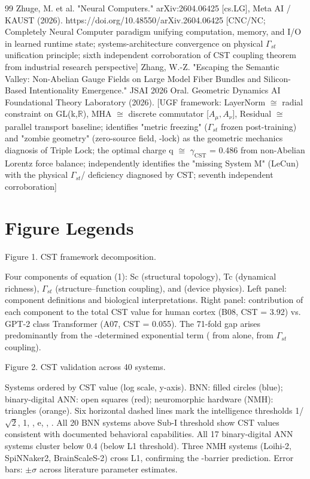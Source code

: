 \documentclass[a4paper,12pt]{article}
\begin{document}
\begin{thebibliography}{99}
 Zhuge, M. et al. "Neural Computers." arXiv:2604.06425 [cs.LG], Meta AI / KAUST (2026). https://doi.org/10.48550/arXiv.2604.06425 [CNC/NC; Completely Neural Computer paradigm unifying computation, memory, and I/O in learned runtime state; systems-architecture convergence on physical $\Gamma_{st}$ unification principle; sixth independent corroboration of CST coupling theorem from industrial research perspective]
 Zhang, W.-Z. "Escaping the Semantic Valley: Non-Abelian Gauge Fields on Large Model Fiber Bundles and Silicon-Based Intentionality Emergence." JSAI 2026 Oral.
Geometric Dynamics AI Foundational Theory Laboratory (2026). [UGF framework: LayerNorm $\cong$ radial constraint on GL(k,$\mathbb{R}$), MHA $\cong$ discrete commutator [$A_{\mu}, A_{\nu}$], Residual $\cong$ parallel transport baseline; identifies "metric freezing" ($\Gamma_{st}$ frozen post-training) and "zombie geometry" (zero-source field,  \alpha -lock) as the geometric mechanics diagnosis of Triple Lock; the optimal charge q
$\cong$ $\gamma_{\text{CST}}$ = 0.486 from non-Abelian Lorentz force balance; independently identifies the "missing System M" (LeCun) with the physical $\Gamma_{st}$/ \alpha  deficiency diagnosed by CST; seventh independent corroboration]
\end{thebibliography}

\section*{Figure Legends}
Figure 1. CST framework decomposition.

Four components of equation (1): Sc (structural topology), Tc (dynamical richness), $\Gamma_{st}$ (structure--function coupling), and  \alpha  (device physics).
Left panel: component definitions and biological interpretations.
Right panel: contribution of each component to the total CST value for human cortex (B08, CST = 3.92) vs.
GPT-2 class Transformer (A07, CST = 0.055).
The 71-fold gap arises predominantly from the  \alpha -determined exponential term (  from  \alpha  alone,   from $\Gamma_{st}$ coupling).

Figure 2. CST validation across 40 systems.

Systems ordered by CST value (log scale, y-axis).
BNN: filled circles (blue); binary-digital ANN: open squares (red); neuromorphic hardware (NMH): triangles (orange).
Six horizontal dashed lines mark the intelligence thresholds {1/$\sqrt{2}$, 1,  \phi , e,  \pi ,  \delta }.
All 20 BNN systems above Sub-I threshold show CST values consistent with documented behavioral capabilities.
All 17 binary-digital ANN systems cluster below 0.4 (below L1 threshold).
Three NMH systems (Loihi-2, SpiNNaker2, BrainScaleS-2) cross L1, confirming the  \alpha -barrier prediction.
Error bars: $\pm\sigma$ across literature parameter estimates.
\end{document}
